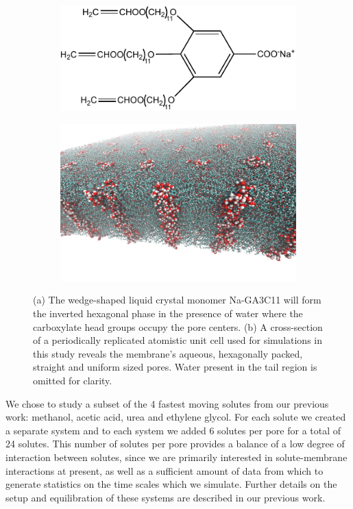 \documentclass[12pt]{article}
\begin{document}
  \begin{figure}
  \centering
  \begin{subfigure}{0.4\textwidth}
  \centering
  \includegraphics[width=\textwidth]{NaGA3C11.pdf}
  \caption{}\label{fig:monomer_structure}
  \end{subfigure}
  \begin{subfigure}{0.5\textwidth}
  \centering
  \includegraphics[width=\textwidth]{membrane_profile.pdf}
  \caption{}\label{fig:membrane_profile}
  \end{subfigure}
  \caption{(a) The wedge-shaped liquid crystal monomer Na-GA3C11 will form the inverted
  hexagonal phase in the presence of water where the carboxylate head groups occupy the
  pore centers. (b) A cross-section of a periodically replicated atomistic unit cell 
  used for simulations in this study reveals the membrane's aqueous, hexagonally packed,
  straight and uniform sized pores. Water present in the tail region is omitted 
  for clarity.}\label{fig:membrane_structure}
  \end{figure}
  
  We chose to study a subset of the 4 fastest moving solutes from our previous
  work: methanol, acetic acid, urea and ethylene glycol. For each solute we 
  created a separate system and to each system we added 6 solutes per pore 
  for a total of 24 solutes. This number of solutes per pore provides a balance
  of a low degree of interaction between solutes, since we are primarily interested 
  in solute-membrane interactions at present, as well as a sufficient amount of 
  data from which to generate statistics on the time scales which we simulate.
  Further details on the setup and equilibration of these systems are described in
  our previous work.\cite{coscia_chemically_2019}
  
\end{document}
